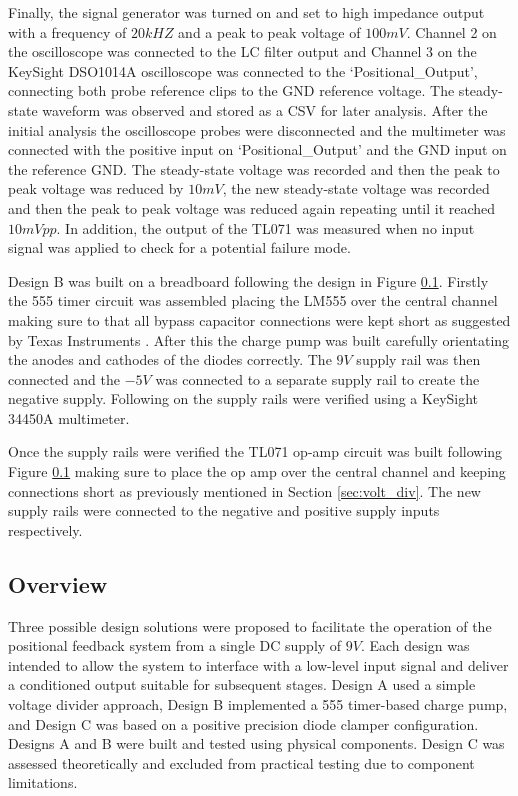 Finally, the signal generator was turned on and set to high impedance output with a frequency of \(20kHZ\) and a peak to peak voltage of \(100mV\). Channel 2 on the oscilloscope was connected to the LC filter output and Channel 3 on the KeySight DSO1014A oscilloscope was connected to the `Positional\_Output', connecting both probe reference clips to the GND reference voltage. The steady-state waveform was observed and stored as a CSV for later analysis. After the initial analysis the oscilloscope probes were disconnected and the multimeter was connected with the positive input on `Positional\_Output' and the GND input on the reference GND. The steady-state voltage was recorded and then the peak to peak voltage was reduced by \(10mV\), the new steady-state voltage was recorded and then the peak to peak voltage was reduced again repeating until it reached \(10mVpp\). In addition, the output of the TL071 was measured when no input signal was applied to check for a potential failure mode.



Design B was built on a breadboard following the design in Figure \ref{}. Firstly the 555 timer circuit was assembled placing the LM555 over the central channel making sure to that all bypass capacitor connections were kept short as suggested by Texas Instruments \cite[Section 10]{TI_LM555}. After this the charge pump was built carefully orientating the anodes and cathodes of the diodes correctly. The \(9V\) supply rail was then connected and the \(-5V\) was connected to a separate supply rail to create the negative supply. Following on the supply rails were verified using a KeySight 34450A multimeter.

Once the supply rails were verified the TL071 op-amp circuit was built following Figure \ref{} making sure to place the op amp over the central channel and keeping connections short as previously mentioned in Section \ref{sec:volt_div}. The new supply rails were connected to the negative and positive supply inputs respectively.



\subsection{Overview}
Three possible design solutions were proposed to facilitate the operation of the positional feedback system from a single DC supply of \(9V\). Each design was intended to allow the system to interface with a low-level input signal and deliver a conditioned output suitable for subsequent stages. Design A used a simple voltage divider approach, Design B implemented a 555 timer-based charge pump, and Design C was based on a positive precision diode clamper configuration. Designs A and B were built and tested using physical components. Design C was assessed theoretically and excluded from practical testing due to component limitations. 

